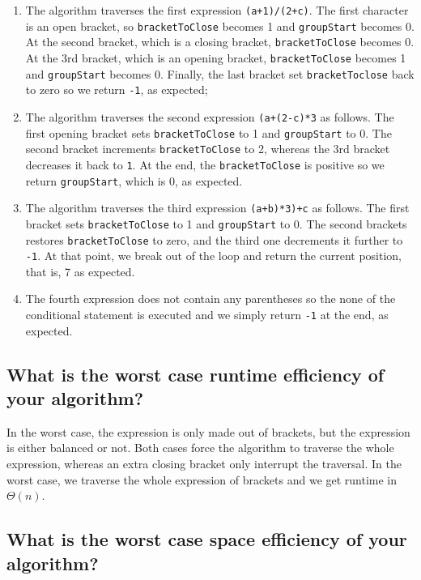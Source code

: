\documentclass[11pt]{article}
\begin{document}
\begin{enumerate}
\item The algorithm traverses the first expression
\texttt{(a+1)/(2+c)}. The first character is an open bracket, so
\texttt{bracketToClose} becomes 1 and \texttt{groupStart} becomes 0. At the
second bracket, which is a closing bracket, \texttt{bracketToClose}
becomes 0.  At the 3rd bracket, which is an opening bracket,
\texttt{bracketToClose} becomes 1 and \texttt{groupStart}
becomes 0. Finally, the last bracket set \texttt{bracketToclose} back
to zero so we return \texttt{-1}, as expected;
\item The algorithm traverses the second expression \texttt{(a+(2-c)*3} as
follows. The first opening bracket sets \texttt{bracketToClose} to 1
and \texttt{groupStart} to 0. The second bracket increments
\texttt{bracketToClose} to 2, whereas the 3rd bracket decreases it
back to \texttt{1}. At the end, the \texttt{bracketToClose} is positive so
we return \texttt{groupStart}, which is 0, as expected.
\item The algorithm traverses the third expression \texttt{(a+b)*3)+c} as
follows. The first bracket sets \texttt{bracketToClose} to 1 and
\texttt{groupStart} to 0. The second brackets restores
\texttt{bracketToClose} to zero, and the third one decrements it
further to \texttt{-1}. At that point, we break out of the loop and
return the current position, that is, 7 as expected.
\item The fourth expression does not contain any parentheses so the
none of the conditional statement is executed and we simply
return \texttt{-1} at the end, as expected.
\end{enumerate}

\subsection{What is the worst case runtime efficiency of your algorithm?}
\label{sec:org8b16299}

In the worst case, the expression is only made out of brackets, but
the expression is either balanced or not. Both cases force the
algorithm to traverse the whole expression, whereas an extra
closing bracket only interrupt the traversal. In the worst case, we
traverse the whole expression of brackets and we get runtime in
\(\Theta(n)\).

\subsection{What is the worst case space efficiency of your algorithm?}
\label{sec:orga3e0d61}
\end{document}
